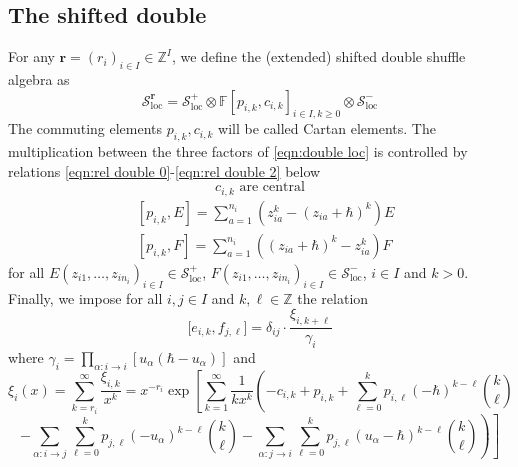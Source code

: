 \documentclass{amsart}
\def\BF{{\mathbb{F}}}
\def\BZ{{\mathbb{Z}}}
\def\CS{{\mathcal{S}}}
\def\br{{\mathbf{r}}}
\def\zz{{\mathbb{Z}^I}}
\def\field{\BF}
\begin{document}
\medskip 

\subsection{The shifted double}
\label{sub:double}

For any $\br = (r_i)_{i \in I} \in \zz$, we define the (extended) shifted double shuffle algebra as
\begin{equation}
\label{eqn:double loc}
\CS^{\br}_{\text{loc}} = \CS^+_{\text{loc}} \otimes \field [p_{i,k}, c_{i, k} ]_{i \in I, k \geq 0} \otimes \CS^-_{\text{loc}}
\end{equation}
The commuting elements $p_{i,k}, c_{i,k}$ will be called Cartan elements. The multiplication between the three factors of \eqref{eqn:double loc} is controlled by relations \eqref{eqn:rel double 0}-\eqref{eqn:rel double 2} below 
\begin{equation}
\label{eqn:rel double 0}
c_{i, k} \text{ are central}
\end{equation}
\begin{equation}
\label{eqn:rel double 1}
\begin{split}
&[p_{i,k}, E] = \sum_{a=1}^{n_i} \left( z_{ia}^k - (z_{ia}+\hbar)^k\right) E \\
&[p_{i,k}, F] = \sum_{a=1}^{n_i} \left(  (z_{ia}+\hbar)^k - z_{ia}^k\right) F
\end{split}
\end{equation}
for all $E(z_{i1},\dots,z_{in_i})_{i \in I} \in \CS^+_{\text{loc}}$, $F(z_{i1},\dots,z_{in_i})_{i \in I} \in \CS^-_{\text{loc}}$, $i \in I$ and $k > 0$. Finally, we impose for all $i,j \in I$ and $k,\ell \in \BZ$ the relation
\begin{equation}
\label{eqn:rel double 2}
\Big[e_{i,k}, f_{j,\ell} \Big] = \delta_{ij} \cdot \frac {\xi_{i,k+\ell}}{\gamma_i} 
\end{equation} 
where $\gamma_i = \prod_{\alpha : i \rightarrow i} \left[ u_\alpha(\hbar-u_\alpha)\right]$ and
$$
\xi_i(x) = \sum_{k=r_i}^\infty \frac {\xi_{i,k}}{x^k} = x^{-r_i} \exp \left[\sum_{k=1}^{\infty} \frac 1{kx^k} \left(-c_{i,k}+p_{i,k}+\sum_{\ell=0}^k p_{i,\ell} (-\hbar)^{k-\ell}{k \choose \ell} \right. \right. 
$$
\begin{equation}
\label{eqn:def xi}
\left. \left. - \sum_{\alpha:i \rightarrow j} \sum_{\ell=0}^{k} p_{j,\ell} (-u_\alpha)^{k-\ell} {k \choose \ell} - \sum_{\alpha:j \rightarrow i} \sum_{\ell=0}^{k} p_{j,\ell} (u_\alpha-\hbar)^{k-\ell} {k \choose \ell} \right) \right]
\end{equation}
\end{document}
